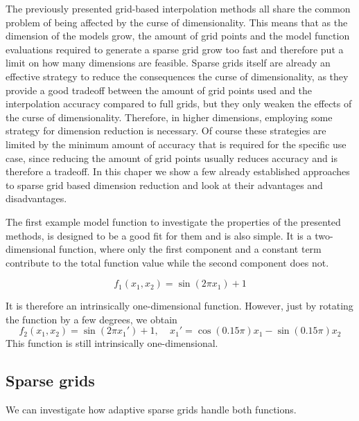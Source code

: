 \documentclass[
  a4paper,  %
  twoside,  %
  bibliography=totoc,
  headsepline,
  cleardoublepage=empty,
  parskip=half,
  draft=false
]{scrbook}
\begin{document}
The previously presented grid-based interpolation methods all share the common problem of being affected by the curse of dimensionality.
This means that as the dimension of the models grow, the amount of grid points and the model function evaluations required to generate a sparse grid grow too fast and therefore put a limit on how many dimensions are feasible.
Sparse grids itself are already an effective strategy to reduce the consequences the curse of dimensionality, as they provide a good tradeoff between the amount of grid points used and the interpolation accuracy compared to full grids, but they only weaken the effects of the curse of dimensionality.
Therefore, in higher dimensions, employing some strategy for dimension reduction is necessary.
Of course these strategies are limited by the minimum amount of accuracy that is required for the specific use case, since reducing the amount of grid points usually reduces accuracy and is therefore a tradeoff.
In this chaper we show a few already established approaches to sparse grid based dimension reduction and look at their advantages and disadvantages.

The first example model function to investigate the properties of the presented methods, is designed to be a good fit for them and is also simple.
It is a two-dimensional function, where only the first component and a constant term contribute to the total function value while the second component does not.

\begin{equation}
f_1(x_1, x_2)=\sin(2 \pi x_1) + 1
\nonumber
\end{equation}

It is therefore an intrinsically one-dimensional function.
However, just by rotating the function by a few degrees, we obtain
\begin{equation}
f_2(x_1,x_2)=\sin(2 \pi x_1') + 1, ~~~~~ x_1'=\cos(0.15 \pi) x_1 -\sin(0.15 \pi) x_2
\end{equation}
This function is still intrinsically one-dimensional.

\subsection{Sparse grids}
We can investigate how adaptive sparse grids handle both functions.
\end{document}
